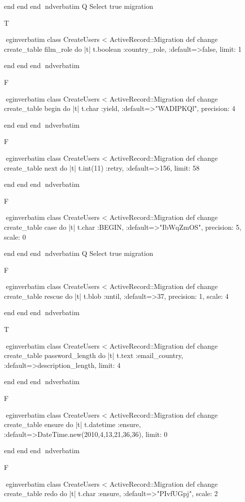     end 
  end 
end
nd{verbatim}
Q
 Select true migration

T

egin{verbatim}
 class CreateUsers < ActiveRecord::Migration 
  def change 
    create_table film_role do |t| 
      t.boolean :country_role, :default=>false, limit: 1
    
    end 
  end 
end
nd{verbatim}

F

egin{verbatim}
 class CreateUsers < ActiveRecord::Migration 
  def change 
    create_table begin do |t| 
      t.char :yield, :default=>"WADIPKQl", precision: 4
    
    end 
  end 
end
nd{verbatim}

F

egin{verbatim}
 class CreateUsers < ActiveRecord::Migration 
  def change 
    create_table next do |t| 
      t.int(11) :retry, :default=>156, limit: 58
    
    end 
  end 
end
nd{verbatim}

F

egin{verbatim}
 class CreateUsers < ActiveRecord::Migration 
  def change 
    create_table case do |t| 
      t.char :BEGIN, :default=>"IbWqZmOS", precision: 5, scale: 0
    
    end 
  end 
end
nd{verbatim}
Q
 Select true migration

F

egin{verbatim}
 class CreateUsers < ActiveRecord::Migration 
  def change 
    create_table rescue do |t| 
      t.blob :until, :default=>37, precision: 1, scale: 4
    
    end 
  end 
end
nd{verbatim}

T

egin{verbatim}
 class CreateUsers < ActiveRecord::Migration 
  def change 
    create_table password_length do |t| 
      t.text :email_country, :default=>description_length, limit: 4
    
    end 
  end 
end
nd{verbatim}

F

egin{verbatim}
 class CreateUsers < ActiveRecord::Migration 
  def change 
    create_table ensure do |t| 
      t.datetime :ensure, :default=>DateTime.new(2010,4,13,21,36,36), limit: 0
    
    end 
  end 
end
nd{verbatim}

F

egin{verbatim}
 class CreateUsers < ActiveRecord::Migration 
  def change 
    create_table redo do |t| 
      t.char :ensure, :default=>"PIvfUGpj", scale: 2
    
